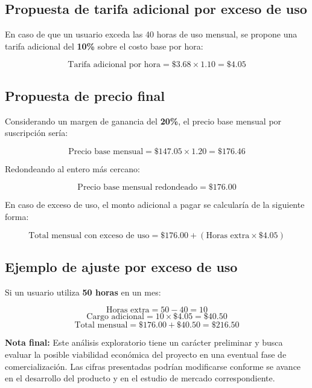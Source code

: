 \subsection{Propuesta de tarifa adicional por exceso de uso}

En caso de que un usuario exceda las 40 horas de uso mensual, se propone una tarifa adicional del \textbf{10\%} sobre el costo base por hora:

\[
\text{Tarifa adicional por hora} = \$3.68 \times 1.10 = \$4.05
\]

\subsection{Propuesta de precio final}

Considerando un margen de ganancia del \textbf{20\%}, el precio base mensual por suscripción sería:

\[
\text{Precio base mensual} = \$147.05 \times 1.20 = \$176.46
\]

Redondeando al entero más cercano:

\[
\text{Precio base mensual redondeado} = \$176.00
\]

En caso de exceso de uso, el monto adicional a pagar se calcularía de la siguiente forma:

\[
\text{Total mensual con exceso de uso} = \$176.00 + (\text{Horas extra} \times \$4.05)
\]

\subsection{Ejemplo de ajuste por exceso de uso}

Si un usuario utiliza \textbf{50 horas} en un mes:

\[
\text{Horas extra} = 50 - 40 = 10
\]
\[
\text{Cargo adicional} = 10 \times \$4.05 = \$40.50
\]
\[
\text{Total mensual} = \$176.00 + \$40.50 = \$216.50
\]

\begin{flushleft}
	\textbf{Nota final:} Este análisis exploratorio tiene un carácter preliminar y busca evaluar la posible viabilidad económica del proyecto en una eventual fase de comercialización. Las cifras presentadas podrían modificarse conforme se avance en el desarrollo del producto y en el estudio de mercado correspondiente.
\end{flushleft}
